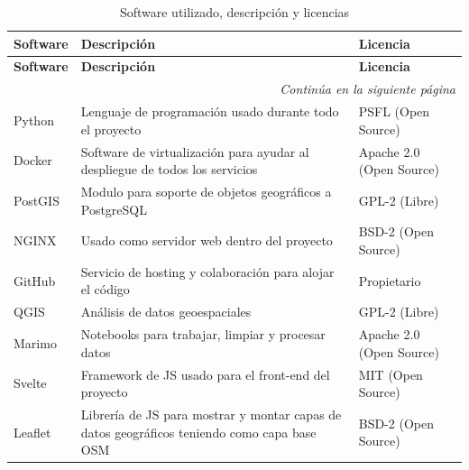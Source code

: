 \begin{longtable}{|p{}|p{}|p{}|}
  \caption{Software utilizado, descripción y licencias}
  \label{tab:software} \\
  \hline
  \textbf{Software} & \textbf{Descripción} & \textbf{Licencia} \\ 
  \hline
  \endfirsthead

  \hline
  \textbf{Software} & \textbf{Descripción} & \textbf{Licencia} \\ 
  \hline
  \endhead

  \hline
  \multicolumn{3}{r}{\emph{Continúa en la siguiente página}} \\
  \endfoot

  \hline
  \endlastfoot

  Python & Lenguaje de programación usado durante todo el proyecto & PSFL (Open Source)\cite{python_license} \\ \hline

  Docker & Software de virtualización para ayudar al despliegue de todos los servicios & Apache 2.0 (Open Source)\cite{moby_license} \\ \hline

  PostGIS & Modulo para soporte de objetos geográficos a PostgreSQL & GPL-2 (Libre)\cite{postgis} \\ \hline

  NGINX & Usado como servidor web dentro del proyecto & BSD-2 (Open Source)\cite{nginx_license} \\ \hline

  GitHub & Servicio de hosting y colaboración para alojar el código & Propietario\cite{wiki_github} \\ \hline

  QGIS & Análisis de datos geoespaciales & GPL-2 (Libre)\cite{qgis_license} \\ \hline

  Marimo & Notebooks para trabajar, limpiar y procesar datos & Apache 2.0 (Open Source)\cite{marimo_license} \\ \hline

  Svelte & Framework de \acs{JS} usado para el front-end del proyecto & MIT (Open Source)\cite{svelte_license} \\ \hline

  Leaflet & Librería de \acs{JS} para mostrar y montar capas de datos geográficos teniendo como capa base OSM & BSD-2 (Open Source)\cite{leaflet_license} \\ \hline


\end{longtable}
